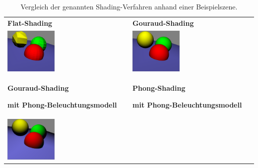 \begin{table}[H]
    \centering
    \caption{Vergleich der genannten Shading-Verfahren anhand einer
    Beispielszene\protect\footnotemark.}\label{table:shading_comparision}
    \begin{tabular}{p{}p{}}
        \toprule
            \textbf{Flat-Shading} &
            \textbf{Gouraud-Shading} \\
        \cmidrule(r){1-1}\cmidrule(lr){2-2}
            \includegraphics[width=0.4\textwidth]{img/flat_shading_example.pdf} \newline &
            \includegraphics[width=0.4\textwidth]{img/gouraud_shading_example.pdf} \newline \\
        \toprule
            \textbf{Gouraud-Shading} \par \textbf{mit Phong-Beleuchtungsmodell} &
            \textbf{Phong-Shading} \par \textbf{mit Phong-Beleuchtungsmodell} \\
        \cmidrule(r){1-1}\cmidrule(lr){2-2}
            \includegraphics[width=0.4\textwidth]{img/phong_gouraud_shading_example.pdf} \newline &

\end{tabular}
\end{table}
